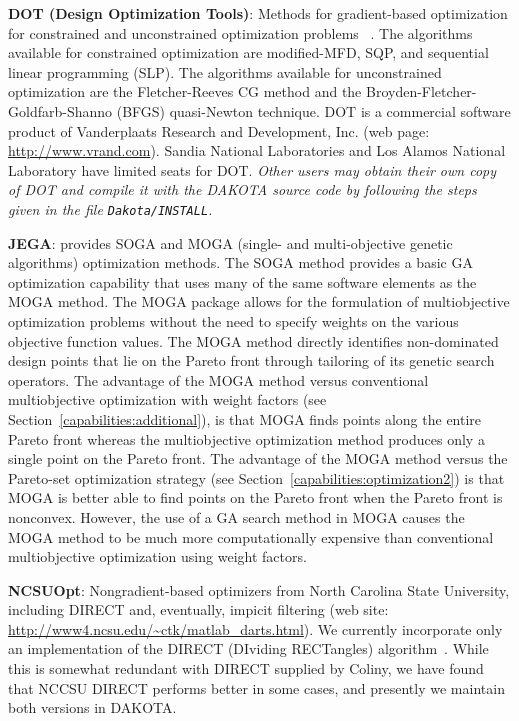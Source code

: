 \textbf{DOT (Design Optimization Tools)}: Methods for gradient-based
optimization for constrained and unconstrained optimization problems
~\cite{Van95}. The algorithms available for constrained optimization are
modified-MFD, SQP, and sequential linear programming (SLP). The
algorithms available for unconstrained optimization are the
Fletcher-Reeves CG method and the Broyden-Fletcher-Goldfarb-Shanno
(BFGS) quasi-Newton technique. DOT is a commercial software product of
Vanderplaats Research and Development, Inc. (web page:
\url{http://www.vrand.com}). Sandia National Laboratories and Los
Alamos National Laboratory have limited seats for DOT. \emph{Other
users may obtain their own copy of DOT and compile it with the DAKOTA
source code by following the steps given in the file {\tt Dakota/INSTALL}.}

\textbf{JEGA}: provides SOGA and MOGA (single- and multi-objective
genetic algorithms) optimization methods. The SOGA method provides a
basic GA optimization capability that uses many of the same software
elements as the MOGA method. The MOGA package allows for the
formulation of multiobjective optimization problems without the need
to specify weights on the various objective function values. The MOGA
method directly identifies non-dominated design points that lie on the
Pareto front through tailoring of its genetic search operators.  The
advantage of the MOGA method versus conventional multiobjective
optimization with weight factors (see
Section~\ref{capabilities:additional}), is that MOGA finds points
along the entire Pareto front whereas the multiobjective optimization
method produces only a single point on the Pareto front. The advantage
of the MOGA method versus the Pareto-set optimization strategy (see
Section~\ref{capabilities:optimization2}) is that MOGA is better able
to find points on the Pareto front when the Pareto front is
nonconvex. However, the use of a GA search method in MOGA causes the
MOGA method to be much more computationally expensive than
conventional multiobjective optimization using weight factors.


\textbf{NCSUOpt}: Nongradient-based optimizers from North Carolina
State University, including DIRECT and, eventually, impicit filtering
(web site: \url{http://www4.ncsu.edu/~ctk/matlab_darts.html}).  We
currently incorporate only an implementation of the DIRECT (DIviding
RECTangles) algorithm~\cite{Gab01}.  While this is somewhat redundant
with DIRECT supplied by Coliny, we have found that NCCSU DIRECT
performs better in some cases, and presently we maintain both versions
in DAKOTA.

